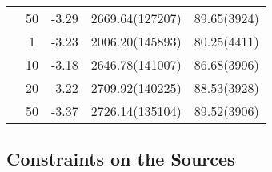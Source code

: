 \begin{table}
\begin{tabular}{SSSSS}
        & 50    & -3.29 & 2669.64(127207) & 89.65(3924) \\
%
        {}
        & 1     & -3.23 & 2006.20(145893) & 80.25(4411) \\
        & 10    & -3.18 & 2646.78(141007) & 86.68(3996) \\
        & 20    & -3.22 & 2709.92(140225) & 88.53(3928) \\
        & 50    & -3.37 & 2726.14(135104) & 89.52(3906) \\
        \bottomrule
    \end{tabular}
\end{table}



\subsection{Constraints on the Sources}


